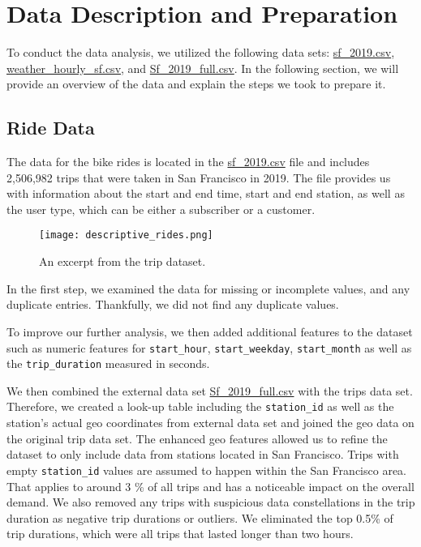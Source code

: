 \section{Data Description and Preparation}
To conduct the data analysis, we utilized the following data sets: \href{run:../../data/sf_2019.csv}{sf\_2019.csv}, \href{run:../../data/weather_hourly_sf.csv}{weather\_hourly\_sf.csv}, and \href{run:../../data/Sf_2019_full.csv}{Sf\_2019\_full.csv}. In the following section, we will provide an overview of the data and explain the steps we took to prepare it.

\subsection{Ride Data}
The data for the bike rides is located in the \href{run:../../data/sf_2019.csv}{sf\_2019.csv} file and includes 2,506,982 trips that were taken in San Francisco in 2019. The file provides us with information about the start and end time, start and end station, as well as the user type, which can be either a subscriber or a customer. 

\begin{figure}[h]
    \texttt{[image: descriptive\_rides.png]}
    \caption{An excerpt from the trip dataset.}
\end{figure}

In the first step, we examined the data for missing or incomplete values, and any duplicate entries. Thankfully, we did not find any duplicate values.

To improve our further analysis, we then added additional features to the dataset such as numeric features for \texttt{start\_hour}, \texttt{start\_weekday}, \texttt{start\_month} as well as the \texttt{trip\_duration} measured in seconds.

We then combined the external data set \href{run:../../data/Sf_2019_full.csv}{Sf\_2019\_full.csv} with the trips data set. Therefore, we created a look-up table including the \texttt{station\_id} as well as the station's actual geo coordinates from external data set and joined the geo data on the original trip data set. 
The enhanced geo features allowed us to refine the dataset to only include data from stations located in San Francisco. Trips with empty \texttt{station\_id} values are assumed to happen within the San Francisco area. That applies to around 3 \% of all trips and has a noticeable impact on the overall demand. We also removed any trips with suspicious data constellations in the trip duration as negative trip durations or outliers. We eliminated the top 0.5\% of trip durations, which were all trips that lasted longer than two hours. 

